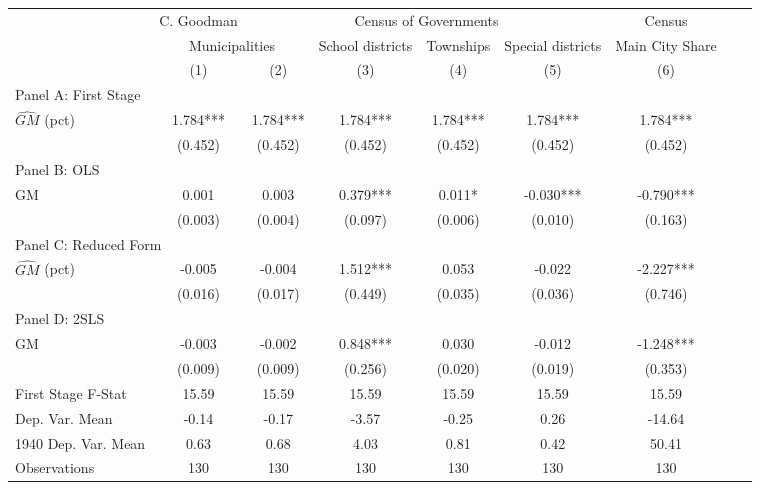  \begin{tabular}{l*{8}{c}} \toprule
&\multicolumn{1}{c}{C. Goodman}&\multicolumn{4}{c}{Census of Governments}&\multicolumn{1}{c}{Census}\\\cmidrule(lr){2-2}\cmidrule(lr){3-6}\cmidrule(lr){7-7}
&\multicolumn{2}{c}{Municipalities}&\multicolumn{1}{c}{School districts}&\multicolumn{1}{c}{Townships}&\multicolumn{1}{c}{Special districts}&\multicolumn{1}{c}{Main City Share}\\\cmidrule(lr){2-3}\cmidrule(lr){4-6}\cmidrule(lr){7-7}
&\multicolumn{1}{c}{(1)}&\multicolumn{1}{c}{(2)}&\multicolumn{1}{c}{(3)}&\multicolumn{1}{c}{(4)}&\multicolumn{1}{c}{(5)}&\multicolumn{1}{c}{(6)}\\
\cmidrule(lr){1-7}
\multicolumn{6}{l}{Panel A: First Stage}\\
\cmidrule(lr){1-7}
$\widehat{GM}$ (pct)&    1.784***&    1.784***&    1.784***&    1.784***&    1.784***&    1.784***\\
                &  (0.452)   &  (0.452)   &  (0.452)   &  (0.452)   &  (0.452)   &  (0.452)   \\
\cmidrule(lr){1-7}
\multicolumn{6}{l}{Panel B: OLS}\\
\cmidrule(lr){1-7}
GM              &    0.001   &    0.003   &    0.379***&    0.011*  &   -0.030***&   -0.790***\\
                &  (0.003)   &  (0.004)   &  (0.097)   &  (0.006)   &  (0.010)   &  (0.163)   \\
\cmidrule(lr){1-7}
\multicolumn{6}{l}{Panel C: Reduced Form}\\
\cmidrule(lr){1-7}
$\widehat{GM}$ (pct)&   -0.005   &   -0.004   &    1.512***&    0.053   &   -0.022   &   -2.227***\\
                &  (0.016)   &  (0.017)   &  (0.449)   &  (0.035)   &  (0.036)   &  (0.746)   \\
\cmidrule(lr){1-7}
\multicolumn{6}{l}{Panel D: 2SLS}\\
\cmidrule(lr){1-7}
GM              &   -0.003   &   -0.002   &    0.848***&    0.030   &   -0.012   &   -1.248***\\
                &  (0.009)   &  (0.009)   &  (0.256)   &  (0.020)   &  (0.019)   &  (0.353)   \\
\midrule
First Stage F-Stat&    15.59   &    15.59   &    15.59   &    15.59   &    15.59   &    15.59   \\
Dep. Var. Mean  &    -0.14   &    -0.17   &    -3.57   &    -0.25   &     0.26   &   -14.64   \\
1940 Dep. Var. Mean&     0.63   &     0.68   &     4.03   &     0.81   &     0.42   &    50.41   \\
Observations    &      130   &      130   &      130   &      130   &      130   &      130   \\
 \bottomrule \end{tabular}
